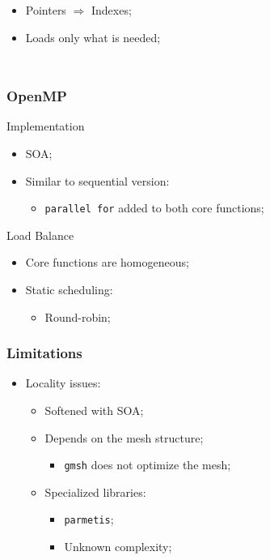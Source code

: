 \documentclass{beamer}
\begin{document}
\begin{frame}
\begin{columns}
			\begin{itemize}
				\item Pointers $\Rightarrow$ Indexes;
				\item Loads only what is needed;
			\end{itemize}
	\end{columns}
\end{frame}

\begin{frame}
	\frametitle{OpenMP}
	\begin{block}{Implementation}
		\begin{itemize}
			\item SOA;
			\item Similar to sequential version:
			\begin{itemize}
				\item \texttt{parallel for} added to both core functions;
			\end{itemize}
		\end{itemize}
	\end{block}	
	\begin{block}{Load Balance}
		\begin{itemize}
			\item Core functions are homogeneous;			
			\item Static scheduling:
			\begin{itemize}
				\item Round-robin;
			\end{itemize}
		\end{itemize}
	\end{block}
\end{frame}

\begin{frame}
	\frametitle{Limitations}
	\begin{itemize}
		\vfill
		\item Locality issues:
		\vfill
		\begin{itemize}
			\item Softened with SOA;
			\vfill
			\item Depends on the mesh structure;
			\begin{itemize}
				\item \texttt{gmsh} does not optimize the mesh;
			\end{itemize}
			\vfill						
			\item Specialized libraries:
			\begin{itemize}
				\item \texttt{parmetis};
				\item Unknown complexity;
			\end{itemize}
		\end{itemize}
	\end{itemize}
\end{frame}
\end{document}
